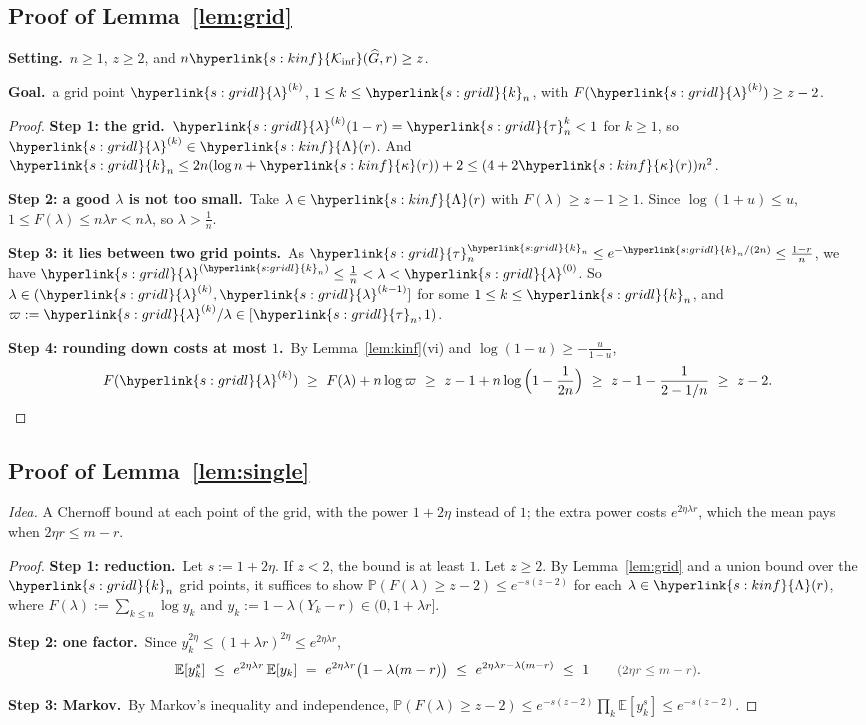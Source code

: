 \documentclass[10pt]{article}
\newcommand{\sy}[2]{{\hyperlink{#1}{#2}}}
\newcommand{\E}{\mathbb{E}}
\newcommand{\PP}{\mathbb{P}}
\newcommand{\1}{\mathbf{1}}
\newcommand{\Ki}{\sy{s:kinf}{\mathcal K_{\inf}}}
\newcommand{\kap}{\sy{s:kinf}{\kappa}}
\newcommand{\Lset}[1]{\sy{s:kinf}{\Lambda}(#1)}
\newcommand{\taun}{\sy{s:gridl}{\tau}}
\newcommand{\lamk}{\sy{s:gridl}{\lambda}}
\newcommand{\kn}{\sy{s:gridl}{k}}
\newcommand{\Setting}{\noindent\textbf{Setting.}\ }
\newcommand{\Goal}{\par\smallskip\noindent\textbf{Goal.}\ }
\newcommand{\stp}[2]{\par\medskip\noindent\textbf{Step #1: #2.}\ }
\newcommand{\why}[1]{\text{\small\color{black!70}(#1)}}
\begin{document}
\subsection{Proof of Lemma~\ref{lem:grid}}\label{sec:pf-lem:grid}
\begin{setgoal}
\Setting $n\ge1$, $z\ge2$, and $n\Ki(\widehat G,r)\ge z$.
\Goal a grid point $\lamk^{(k)}$, $1\le k\le\kn_n$, with $F(\lamk^{(k)})\ge z-2$.
\end{setgoal}
\begin{proof}
\stp1{the grid}$\lamk^{(k)}(1-r)=\taun_n^k<1$ for $k\ge1$, so $\lamk^{(k)}\in\Lset{r}$. And $\kn_n\le2n(\log n+\kap(r))+2\le(4+2\kap(r))n^2$.

\stp2{a good $\lambda$ is not too small}Take $\lambda\in\Lset{r}$ with $F(\lambda)\ge z-1\ge1$. Since $\log(1+u)\le u$, $1\le F(\lambda)\le n\lambda r<n\lambda$, so $\lambda>\frac1n$.

\stp3{it lies between two grid points}As $\taun_n^{\kn_n}\le e^{-\kn_n/(2n)}\le\frac{1-r}n$, we have $\lamk^{(\kn_n)}\le\frac1n<\lambda<\lamk^{(0)}$. So
$\lambda\in(\lamk^{(k)},\lamk^{(k-1)}]$ for some $1\le k\le\kn_n$, and $\varpi:=\lamk^{(k)}/\lambda\in[\taun_n,1)$.

\stp4{rounding down costs at most $1$}By Lemma~\ref{lem:kinf}(vi) and $\log(1-u)\ge-\frac u{1-u}$,
\[
F(\lamk^{(k)})\ \ge\ F(\lambda)+n\log\varpi\ \ge\ z-1+n\log\Big(1-\frac1{2n}\Big)\ \ge\ z-1-\frac{1}{2-1/n}\ \ge\ z-2 .
\]
\end{proof}

\subsection{Proof of Lemma~\ref{lem:single}}\label{sec:pf-lem:single}
\noindent\emph{Idea.} A Chernoff bound at each point of the grid, with the power $1+2\eta$ instead of $1$; the extra power costs $e^{2\eta\lambda r}$, which the mean pays
when $2\eta r\le m-r$.
\begin{proof}
\stp1{reduction}Let $s:=1+2\eta$. If $z<2$, the bound is at least $1$. Let $z\ge2$. By Lemma~\ref{lem:grid} and a union bound over the $\kn_n$ grid points, it suffices to
show $\PP(F(\lambda)\ge z-2)\le e^{-s(z-2)}$ for each $\lambda\in\Lset{r}$, where $F(\lambda):=\sum_{k\le n}\log y_k$ and $y_k:=1-\lambda(Y_k-r)\in(0,1+\lambda r]$.

\stp2{one factor}Since $y_k^{2\eta}\le(1+\lambda r)^{2\eta}\le e^{2\eta\lambda r}$,
\[
\E[y_k^s]\ \le\ e^{2\eta\lambda r}\,\E[y_k]\ =\ e^{2\eta\lambda r}\big(1-\lambda(m-r)\big)\ \le\ e^{2\eta\lambda r-\lambda(m-r)}\ \le\ 1\qquad\why{$2\eta r\le m-r$}.
\]

\stp3{Markov}By Markov's inequality and independence, $\PP(F(\lambda)\ge z-2)\le e^{-s(z-2)}\prod_k\E[y_k^s]\le e^{-s(z-2)}$.
\end{proof}
\end{document}
